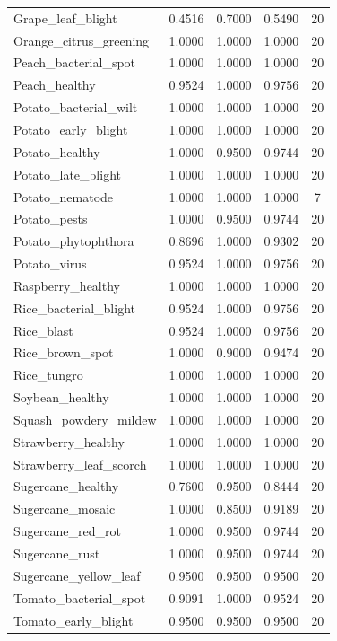 \documentclass{article}
\begin{document}
\begin{center}
\begin{longtable}{lcccc}
Grape\_leaf\_blight & 0.4516 & 0.7000 & 0.5490 & 20 \\
Orange\_citrus\_greening & 1.0000 & 1.0000 & 1.0000 & 20 \\
Peach\_bacterial\_spot & 1.0000 & 1.0000 & 1.0000 & 20 \\
Peach\_healthy & 0.9524 & 1.0000 & 0.9756 & 20 \\
Potato\_bacterial\_wilt & 1.0000 & 1.0000 & 1.0000 & 20 \\
Potato\_early\_blight & 1.0000 & 1.0000 & 1.0000 & 20 \\
Potato\_healthy & 1.0000 & 0.9500 & 0.9744 & 20 \\
Potato\_late\_blight & 1.0000 & 1.0000 & 1.0000 & 20 \\
Potato\_nematode & 1.0000 & 1.0000 & 1.0000 & 7 \\
Potato\_pests & 1.0000 & 0.9500 & 0.9744 & 20 \\
Potato\_phytophthora & 0.8696 & 1.0000 & 0.9302 & 20 \\
Potato\_virus & 0.9524 & 1.0000 & 0.9756 & 20 \\
Raspberry\_healthy & 1.0000 & 1.0000 & 1.0000 & 20 \\
Rice\_bacterial\_blight & 0.9524 & 1.0000 & 0.9756 & 20 \\
Rice\_blast & 0.9524 & 1.0000 & 0.9756 & 20 \\
Rice\_brown\_spot & 1.0000 & 0.9000 & 0.9474 & 20 \\
Rice\_tungro & 1.0000 & 1.0000 & 1.0000 & 20 \\
Soybean\_healthy & 1.0000 & 1.0000 & 1.0000 & 20 \\
Squash\_powdery\_mildew & 1.0000 & 1.0000 & 1.0000 & 20 \\
Strawberry\_healthy & 1.0000 & 1.0000 & 1.0000 & 20 \\
Strawberry\_leaf\_scorch & 1.0000 & 1.0000 & 1.0000 & 20 \\
Sugercane\_healthy & 0.7600 & 0.9500 & 0.8444 & 20 \\
Sugercane\_mosaic & 1.0000 & 0.8500 & 0.9189 & 20 \\
Sugercane\_red\_rot & 1.0000 & 0.9500 & 0.9744 & 20 \\
Sugercane\_rust & 1.0000 & 0.9500 & 0.9744 & 20 \\
Sugercane\_yellow\_leaf & 0.9500 & 0.9500 & 0.9500 & 20 \\
Tomato\_bacterial\_spot & 0.9091 & 1.0000 & 0.9524 & 20 \\
Tomato\_early\_blight & 0.9500 & 0.9500 & 0.9500 & 20 \\

\end{longtable}
\end{center}
\end{document}
